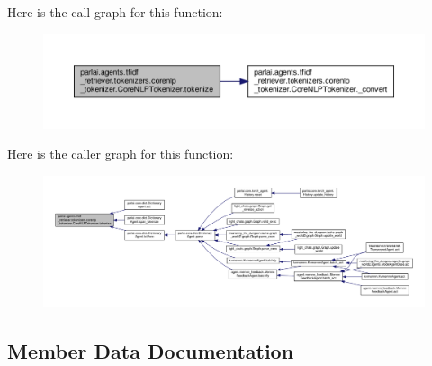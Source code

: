 Here is the call graph for this function\+:
\nopagebreak
\begin{figure}[H]
\begin{center}
\leavevmode
\includegraphics[width=350pt]{classparlai_1_1agents_1_1tfidf__retriever_1_1tokenizers_1_1corenlp__tokenizer_1_1CoreNLPTokenizer_af7fb8c70ddbd8c11e3e32365af30e567_cgraph}
\end{center}
\end{figure}
Here is the caller graph for this function\+:
\nopagebreak
\begin{figure}[H]
\begin{center}
\leavevmode
\includegraphics[width=350pt]{classparlai_1_1agents_1_1tfidf__retriever_1_1tokenizers_1_1corenlp__tokenizer_1_1CoreNLPTokenizer_af7fb8c70ddbd8c11e3e32365af30e567_icgraph}
\end{center}
\end{figure}


\subsection{Member Data Documentation}
\mbox{\label{classparlai_1_1agents_1_1tfidf__retriever_1_1tokenizers_1_1corenlp__tokenizer_1_1CoreNLPTokenizer_a3813fe96a6ae9af6f6490a6d3f4d6ea8}} 
